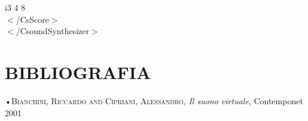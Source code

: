 \documentclass[11pt]{article}
\begin{document}
\begin{multicols*}{2}
\begin{center}
\begin{minipage}[c]{6.2cm}
\begin{sffamily}
i3 4	   8  \\
$<$/CsScore$>$\\
$<$/CsoundSynthesizer$>$\\

\end{sffamily}
\end{minipage}
\end{center}

\section*{\centering\small{BIBLIOGRAFIA}}
•\textsc{\textsf {Bianchini, Riccardo and Cipriani, Alessandro}}, \emph{Il suono virtuale}, Contemponet 2001\\

\end{multicols*}
\end{document}

